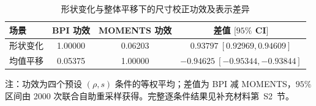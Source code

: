 \begin{table}[H]
\centering
\small
\caption{形状变化与整体平移下的尺寸校正功效及表示差异}\label{tab:h1}
\begin{tabular}{lccc}
\toprule
场景 & BPI 功效 & MOMENTS 功效 & 差值 $[95\%$ CI$]$\\
\midrule
形状变化 & 1.00000 & 0.06203 & $0.93797\ [0.92969,0.94609]$\\
均值平移 & 0.05375 & 1.00000 & $-0.94625\ [-0.95344,-0.93844]$\\
\bottomrule
\end{tabular}

\vspace{0.2em}
\begin{minipage}{0.95\textwidth}
\footnotesize 注：功效为四个预设 $(\rho,s)$ 条件的等权平均；差值为 BPI 减 MOMENTS，$95\%$ 区间由 2000 次联合自助重采样获得。完整逐条件结果见补充材料第~S2~节。
\end{minipage}
\end{table}
